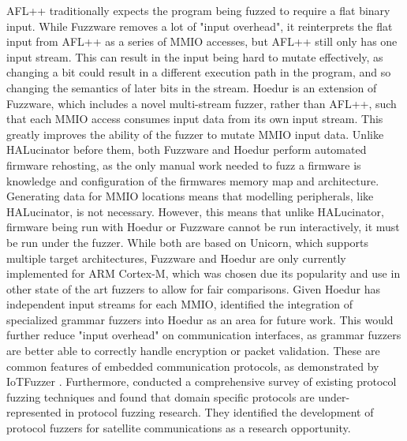 \documentclass[../report.tex]{subfiles}
\begin{document}
AFL++ traditionally expects the program being fuzzed to require a flat binary input.
While Fuzzware removes a lot of "input overhead", it reinterprets the flat
input from AFL++ as a series of MMIO accesses, but AFL++ still only has one input
stream. This can result in the input being hard to mutate effectively, as
changing a bit could result in a different execution path in the program, and
so changing the semantics of later bits in the stream.
Hoedur \citep{Hoedur_2023} is an extension of Fuzzware, which includes a novel
multi-stream fuzzer, rather than AFL++, such that each MMIO access consumes input
data from its own input stream. This greatly improves the ability of the fuzzer
to mutate MMIO input data. Unlike HALucinator before them, both Fuzzware and
Hoedur perform automated firmware rehosting, as the only manual work needed to
fuzz a firmware is knowledge and configuration of the firmwares memory map and
architecture. Generating data for MMIO locations means that modelling
peripherals, like HALucinator, is not necessary. However, this means that
unlike HALucinator, firmware being run with Hoedur or Fuzzware cannot be run
interactively, it must be run under the fuzzer. While both are based on
Unicorn, which supports multiple target architectures, Fuzzware and Hoedur are
only currently implemented for ARM Cortex-M, which was chosen due its popularity
and use in other state of the art fuzzers to allow for fair comparisons. Given
Hoedur has independent input streams for each MMIO, \citet{Hoedur_2023}
identified the integration of specialized grammar fuzzers into Hoedur as an
area for future work. This would further reduce "input overhead" on
communication interfaces, as grammar fuzzers are better able to correctly
handle encryption or packet validation. These are common features of embedded
communication protocols, as demonstrated by IoTFuzzer \citep{IOTFuzzer_2018}.
Furthermore, \citet{Zhang_2024} conducted a comprehensive survey of existing
protocol fuzzing techniques and found that domain specific protocols are
under-represented in protocol fuzzing research. They identified the development
of protocol fuzzers for satellite communications as a research opportunity.
\end{document}
